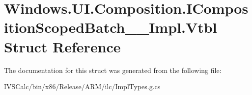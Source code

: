 \hypertarget{struct_windows_1_1_u_i_1_1_composition_1_1_i_composition_scoped_batch_____impl_1_1_vtbl}{}\section{Windows.\+U\+I.\+Composition.\+I\+Composition\+Scoped\+Batch\+\_\+\+\_\+\+Impl.\+Vtbl Struct Reference}
\label{struct_windows_1_1_u_i_1_1_composition_1_1_i_composition_scoped_batch_____impl_1_1_vtbl}


The documentation for this struct was generated from the following file\+:\begin{DoxyCompactItemize}
\item 
I\+V\+S\+Calc/bin/x86/\+Release/\+A\+R\+M/ilc/Impl\+Types.\+g.\+cs\end{DoxyCompactItemize}
